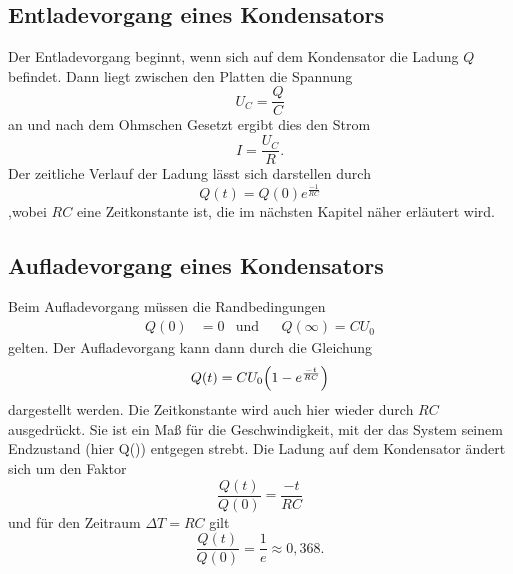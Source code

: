 \subsection{Entladevorgang eines Kondensators} %
\label{sub:Entladevorgang}
Der Entladevorgang beginnt, wenn sich auf dem Kondensator die Ladung $Q$ befindet.
Dann liegt zwischen den Platten die Spannung
\begin{equation}
    U_C = \frac{Q}{C}
    \label{eqn:Kondensatorspannung}
\end{equation}
an und nach dem Ohmschen Gesetzt ergibt dies den Strom
\begin{equation}
    I = \frac{U_C}{R} .
\end{equation}
Der zeitliche Verlauf der Ladung lässt sich darstellen durch
\begin{equation}
    Q(t) = Q(0) e^{\frac{-1}{RC}}
    \label{eqn:Ladung_zeitlich}
\end{equation}
,wobei $RC$ eine Zeitkonstante ist, die im nächsten Kapitel näher erläutert wird.


\subsection{Aufladevorgang eines Kondensators} %
\label{sub:Aufladevorgang}
Beim Aufladevorgang müssen die Randbedingungen
\begin{align}
    Q(0)&=0 &\text{und}&& Q(\infty)=CU_0
\end{align}
gelten. Der Aufladevorgang kann dann durch die Gleichung
\begin{equation}
    Q(t)= CU_0\Bigl(1-e^{\frac{-t}{RC}}\Bigr)
\end{equation}
dargestellt werden. Die Zeitkonstante wird auch hier wieder durch $RC$ ausgedrückt.
Sie ist ein Maß für die Geschwindigkeit, mit der das System seinem Endzustand (hier Q(\infty)) entgegen strebt.
Die Ladung auf dem Kondensator ändert sich um den Faktor
\begin{equation}
    \frac{Q(t)}{Q(0)} = \frac{-t}{RC}
\end{equation}
und für den Zeitraum $\Delta T = RC$ gilt
\begin{equation}
    \frac{Q(t)}{Q(0)} = \frac{1}{e} \approx 0,368 .
\end{equation}



